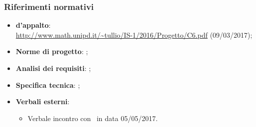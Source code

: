 \documentclass[../DefinizioneDiProdotto.tex]{subfiles}
\begin{document}
			\subsubsection{Riferimenti normativi}
    			\begin{itemize}
    				\item \textbf{ d'appalto}:\\
    				\url{http://www.math.unipd.it/~tullio/IS-1/2016/Progetto/C6.pdf} (09/03/2017);
    				\item \textbf{Norme di progetto}: \normediprogettov;
    				\item \textbf{Analisi dei requisiti}: \analisideirequisitiv;
    				\item \textbf{Specifica tecnica}: \specificatecnicav;
    				\item \textbf{Verbali esterni}:
    				\begin{itemize}
    					\item Verbale incontro con \proponente\ in data 05/05/2017.
    				\end{itemize}
				\end{itemize}
\end{document}
